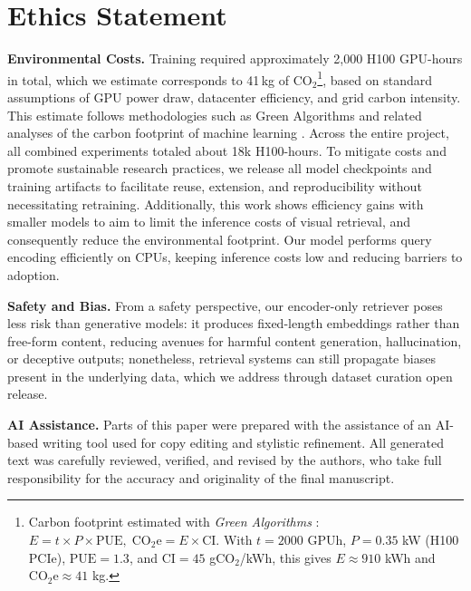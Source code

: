 \documentclass{article} %
\begin{document}













\section*{Ethics Statement}
\noindent\textbf{Environmental Costs.} Training \colflagship required approximately 2{,}000 H100 GPU-hours in total, which we estimate corresponds to 41\,kg of CO$_2$\footnote{Carbon footprint estimated with \textit{Green Algorithms} \citep{Lannelongue2021GreenAlgorithms}: 
$E = t \times P \times \mathrm{PUE},\; \mathrm{CO_{2}e} = E \times \mathrm{CI}$. 
With $t=2000$ GPUh, $P=0.35$ kW (H100 PCIe), $\mathrm{PUE}=1.3$, and $\mathrm{CI}=45$ gCO$_2$/kWh, 
this gives $E \approx 910$ kWh and $\mathrm{CO_{2}e} \approx 41$ kg.}, based on standard assumptions of GPU power draw, datacenter efficiency, and grid carbon intensity. This estimate follows methodologies such as Green Algorithms \citep{Lannelongue2021GreenAlgorithms} and related analyses of the carbon footprint of machine learning \citep{Strubell2019Energy,Patterson2021Carbon}. Across the entire project, all combined experiments totaled about 18k H100-hours. To mitigate costs and promote sustainable research practices, we release all model checkpoints and training artifacts to facilitate reuse, extension, and reproducibility without necessitating retraining. Additionally, this work shows efficiency gains with smaller models to aim to limit the inference costs of visual retrieval, and consequently reduce the environmental footprint. Our model performs query encoding efficiently on CPUs, keeping inference costs low and reducing barriers to adoption. 

\noindent\textbf{Safety and Bias.} From a safety perspective, our encoder-only retriever poses less risk than generative models: it produces fixed-length embeddings rather than free-form content, reducing avenues for harmful content generation, hallucination, or deceptive outputs; nonetheless, retrieval systems can still propagate biases present in the underlying data, which we address through dataset curation open release.

\noindent\textbf{AI Assistance.} Parts of this paper were prepared with the assistance of an AI-based writing tool used for copy editing and stylistic refinement. All generated text was carefully reviewed, verified, and revised by the authors, who take full responsibility for the accuracy and originality of the final manuscript.
\end{document}
